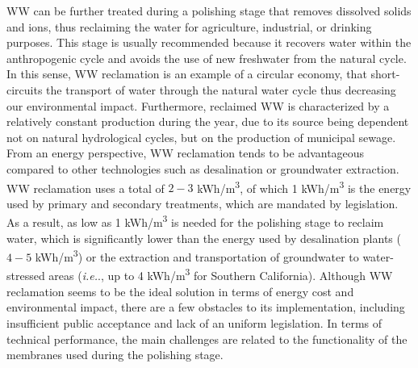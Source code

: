 WW can be further treated during a polishing stage that removes dissolved solids and ions, thus reclaiming the water for agriculture, industrial, or drinking purposes. This stage is usually recommended because it recovers water within the anthropogenic cycle and avoids the use of new freshwater from the natural cycle. In this sense, WW reclamation is an example of a circular economy, that short-circuits the transport of water through the natural water cycle  thus decreasing our environmental impact. Furthermore, reclaimed WW is characterized by a relatively constant production during the year, due to its source being dependent not on natural hydrological cycles, but on the production of municipal sewage. \cite{pintilie2016urban}\\
From an energy perspective, WW reclamation tends to be advantageous compared to other technologies such as desalination or groundwater extraction. WW reclamation uses a total of $2-3$ kWh/m\textsuperscript{3},\cite{guerrini2017energy} of which 1 kWh/m\textsuperscript{3}\cite{qasim2017wastewater} is the energy used by primary and secondary treatments, which are mandated by legislation.\cite{hunter2016enforcing} As a result, as low as 1 kWh/m\textsuperscript{3} is needed for the polishing stage to reclaim water, which is significantly lower than the energy used by desalination plants ($4-5$ kWh/m\textsuperscript{3}) \cite{elimelech2011future,stillwell2016predicting} or the extraction and transportation of groundwater to water-stressed areas (\textit{i.e.}., up to 4 kWh/m\textsuperscript{3} for Southern California).\cite{schneir2010} Although WW reclamation seems to be the ideal solution in terms of energy cost and environmental impact, there are a few obstacles to its implementation, including insufficient public acceptance and lack of an uniform legislation. In terms of technical performance, the main challenges are related to the functionality of the membranes used during the polishing stage.



